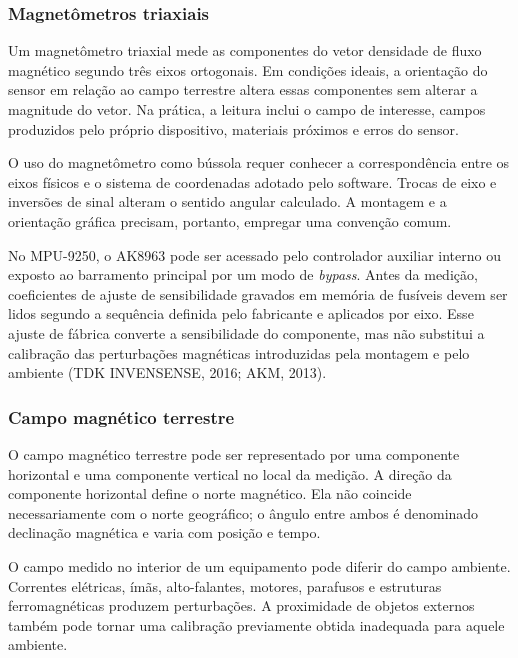 \documentclass{article}
\begin{document}
\subsubsection{Magnet\^ometros triaxiais}


Um magnet\^ometro triaxial mede as componentes do vetor densidade de fluxo magn\'etico segundo tr\^es eixos ortogonais. Em condi\c{c}\~oes ideais, a orienta\c{c}\~ao do sensor em rela\c{c}\~ao ao campo terrestre altera essas componentes sem alterar a magnitude do vetor. Na pr\'atica, a leitura inclui o campo de interesse, campos produzidos pelo pr\'oprio dispositivo, materiais pr\'oximos e erros do sensor.


O uso do magnet\^ometro como b\'ussola requer conhecer a correspond\^encia entre os eixos f\'isicos e o sistema de coordenadas adotado pelo software. Trocas de eixo e invers\~oes de sinal alteram o sentido angular calculado. A montagem e a orienta\c{c}\~ao gr\'afica precisam, portanto, empregar uma conven\c{c}\~ao comum.


No MPU-9250, o AK8963 pode ser acessado pelo controlador auxiliar interno ou exposto ao barramento principal por um modo de \emph{bypass}. Antes da medi\c{c}\~ao, coeficientes de ajuste de sensibilidade gravados em mem\'oria de fus\'iveis devem ser lidos segundo a sequ\^encia definida pelo fabricante e aplicados por eixo. Esse ajuste de f\'abrica converte a sensibilidade do componente, mas n\~ao substitui a calibra\c{c}\~ao das perturba\c{c}\~oes magn\'eticas introduzidas pela montagem e pelo ambiente (TDK INVENSENSE, 2016; AKM, 2013).


\subsubsection{Campo magn\'etico terrestre}


O campo magn\'etico terrestre pode ser representado por uma componente horizontal e uma componente vertical no local da medi\c{c}\~ao. A dire\c{c}\~ao da componente horizontal define o norte magn\'etico. Ela n\~ao coincide necessariamente com o norte geogr\'afico; o \^angulo entre ambos \'e denominado declina\c{c}\~ao magn\'etica e varia com posi\c{c}\~ao e tempo.


O campo medido no interior de um equipamento pode diferir do campo ambiente. Correntes el\'etricas, \'im\~as, alto-falantes, motores, parafusos e estruturas ferromagn\'eticas produzem perturba\c{c}\~oes. A proximidade de objetos externos tamb\'em pode tornar uma calibra\c{c}\~ao previamente obtida inadequada para aquele ambiente.
\end{document}
